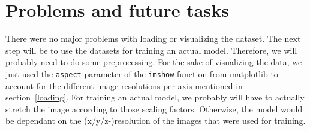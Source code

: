 \documentclass{article}
\begin{document}
	\section{Problems and future tasks}

		There were no major problems with loading or visualizing the dataset. The next step will be to use the datasets for training an actual model. Therefore, we will probably need to do some preprocessing. For the sake of visualizing the data, we just used the \lstinline{aspect} parameter of the \lstinline{imshow} function from matplotlib to account for the different image resolutions per axis mentioned in section~\ref{loading}. For training an actual model, we probably will have to actually stretch the image according to those scaling factors. Otherwise, the model would be dependant on the (x/y/z-)resolution of the images that were used for training.
\end{document}
